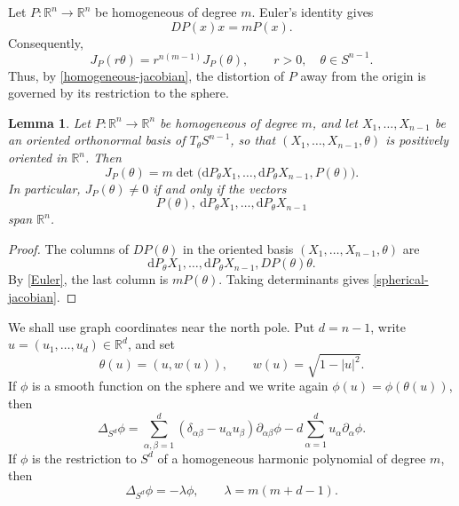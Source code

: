 \documentclass[10pt]{amsart}
\numberwithin{equation}{section}
\newtheorem{lemma}[theorem]{Lemma}
\theoremstyle{definition}
\newcommand{\R}{\mathbb R}
\begin{document}
Let \(P:\R^n\to\R^n\) be homogeneous of degree \(m\). Euler's identity gives
\begin{equation}\label{Euler}
        DP(x)x=mP(x).
\end{equation}
Consequently,
\begin{equation}\label{homogeneous-jacobian}
        J_P(r\theta)=r^{n(m-1)}J_P(\theta),
        \qquad r>0,\quad \theta\in S^{n-1}.
\end{equation}
Thus, by \eqref{homogeneous-jacobian}, the distortion of \(P\) away from the origin is governed by its
restriction to the sphere.

\begin{lemma}
\label{lem-spherical-jacobian}
Let \(P:\R^n\to\R^n\) be homogeneous of degree \(m\), and let
\(X_1,\ldots,X_{n-1}\) be an oriented orthonormal basis of \(T_\theta S^{n-1}\),
so that \((X_1,\ldots,X_{n-1},\theta)\) is positively oriented in \(\R^n\).
Then
\begin{equation}\label{spherical-jacobian}
        J_P(\theta)
        =
        m\det\bigl(\mathrm{d}P_\theta X_1,\ldots,\mathrm{d}P_\theta X_{n-1},P(\theta)\bigr).
\end{equation}
In particular, \(J_P(\theta)\ne0\) if and only if the vectors
\[
        P(\theta),\ \mathrm{d}P_\theta X_1,\ldots,\mathrm{d}P_\theta X_{n-1}
\]
span \(\R^n\).
\end{lemma}

\begin{proof}
The columns of \(DP(\theta)\) in the oriented basis
\((X_1,\ldots,X_{n-1},\theta)\) are
\[
        \mathrm{d}P_\theta X_1,\ldots,\mathrm{d}P_\theta X_{n-1},DP(\theta)\theta.
\]
By \eqref{Euler}, the last column is \(mP(\theta)\). Taking determinants
gives \eqref{spherical-jacobian}.
\end{proof}

We shall use graph coordinates near the north pole. Put \(d=n-1\), write
\(u=(u_1,\ldots,u_d)\in\R^d\), and set
\begin{equation}\label{graph-coordinates}
        \theta(u)=(u,w(u)),
        \qquad
        w(u)=\sqrt{1-|u|^2}.
\end{equation}
If \(\phi\) is a smooth function on the sphere and we write again
\(\phi(u)=\phi(\theta(u))\), then
\begin{equation}\label{sphere-laplacian}
        \Delta_{S^d}\phi
        =
        \sum_{\alpha,\beta=1}^{d}(\delta_{\alpha\beta}-u_\alpha u_\beta)
        \partial_{\alpha\beta}\phi
        -
        d\sum_{\alpha=1}^{d}u_\alpha\partial_\alpha\phi .
\end{equation}
If \(\phi\) is the restriction to \(S^d\) of a homogeneous harmonic
polynomial of degree \(m\), then
\begin{equation}\label{spherical-eigenvalue}
        \Delta_{S^d}\phi=-\lambda\phi,
        \qquad
        \lambda=m(m+d-1).
\end{equation}
\end{document}
